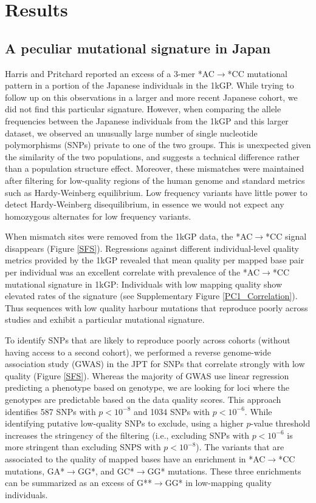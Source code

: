 \documentclass[9pt,lineno]{elife}
\begin{document}
			\section{Results}
	\subsection{A peculiar mutational signature in Japan}			
	
Harris and Pritchard reported an excess of a 3-mer *AC${\rightarrow}$*CC mutational pattern in a portion of the Japanese individuals in the 1kGP.\cite{Harris2015a}
While trying to follow up on this observations in a larger and more recent Japanese cohort, we did not find this particular signature.
However, when comparing the allele frequencies between the Japanese individuals from the 1kGP and this larger dataset, we observed an unusually large number of single nucleotide polymorphisms (SNPs) private to one of the two groups.
This is unexpected given the similarity of the two populations, and suggests a technical difference rather than a population structure effect. 
Moreover, these mismatches were maintained after filtering for low-quality regions of the human genome and standard metrics such as Hardy-Weinberg equilibrium.
Low frequency variants have little power to detect Hardy-Weinberg disequilibrium, in essence we would not expect any homozygous alternates for low frequency variants. 

When mismatch sites were removed from the 1kGP data, the  *AC${\rightarrow}$*CC signal disappears (Figure \ref{SFS}).
Regressions against different individual-level quality metrics provided by the 1kGP revealed that mean quality per mapped base pair per individual was an excellent correlate with prevalence of the  *AC${\rightarrow}$*CC mutational signature in 1kGP:
Individuals with low mapping quality show elevated rates of the signature (see Supplementary Figure \ref{PC1_Correlation}).
Thus sequences with low quality harbour mutations that reproduce poorly across studies and exhibit a particular mutational signature. 

To identify SNPs that are likely to reproduce poorly across cohorts (without having access to a second cohort), we performed a reverse genome-wide association study (GWAS) in the JPT for SNPs that correlate strongly with low quality (Figure \ref{SFS}).
Whereas the majority of GWAS use linear regression predicting a phenotype based on genotype, we are looking for loci where the genotypes are predictable based on the data quality scores.
This approach identifies 587 SNPs with $p < 10^{-8}$ and 1034 SNPs with $ p < 10^{-6}$.
While identifying putative low-quality SNPs to exclude, using a higher $p$-value threshold increases the stringency of the filtering (i.e., excluding SNPs with $ p < 10^{-6}$ is more stringent than excluding SNPS with $p < 10^{-8}$). 
The variants that are associated to the quality of mapped bases have an enrichment in *AC${\rightarrow}$*CC mutations, GA*${\rightarrow}$GG*, and GC*${\rightarrow}$GG* mutations.
These three enrichments can be summarized as an excess of G**${\rightarrow}$GG* in low-mapping quality individuals.
\end{document}
